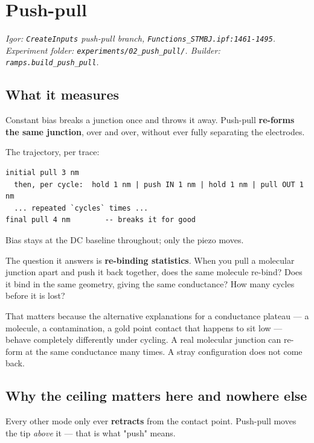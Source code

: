 \setcounter{chapter}{10}
\chapter{Push-pull}

\emph{Igor: \texttt{Create\discretionary{}{}{}Inputs} push-pull branch, \texttt{Functions\_\discretionary{}{}{}STMBJ.\discretionary{}{}{}ipf:1461-1495}. Experiment folder: \texttt{experiments/\discretionary{}{}{}02\_\discretionary{}{}{}push\_\discretionary{}{}{}pull/\discretionary{}{}{}}. Builder: \texttt{ramps.\discretionary{}{}{}build\_\discretionary{}{}{}push\_\discretionary{}{}{}pull}.}

\section{What it measures}

Constant bias breaks a junction once and throws it away. Push-pull \textbf{re-forms the same junction}, over and over, without ever fully separating the electrodes.

The trajectory, per trace:

\begin{lstlisting}[style=out]
initial pull 3 nm
  then, per cycle:  hold 1 nm | push IN 1 nm | hold 1 nm | pull OUT 1 nm
  ... repeated `cycles` times ...
final pull 4 nm        -- breaks it for good
\end{lstlisting}

Bias stays at the DC baseline throughout; only the piezo moves.

The question it answers is \textbf{re-binding statistics}. When you pull a molecular junction apart and push it back together, does the same molecule re-bind? Does it bind in the same geometry, giving the same conductance? How many cycles before it is lost?

That matters because the alternative explanations for a conductance plateau --- a molecule, a contamination, a gold point contact that happens to sit low --- behave completely differently under cycling. A real molecular junction can re-form at the same conductance many times. A stray configuration does not come back.

\section{Why the ceiling matters here and nowhere else}

Every other mode only ever \textbf{retracts} from the contact point. Push-pull moves the tip \emph{above} it --- that is what "push" means.

